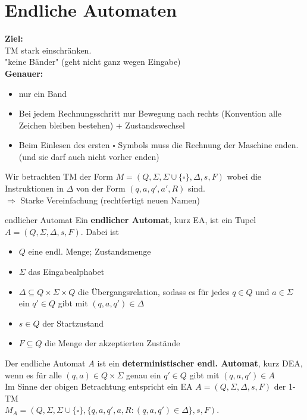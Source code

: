 
\section{Endliche Automaten}
 
\textbf{Ziel:}\\
TM stark einschränken. \\
"keine Bänder" (geht nicht ganz wegen Eingabe)\\

\textbf{Genauer:}
\begin{itemize}
    \item nur ein Band
    \item Bei jedem Rechnungsschritt nur Bewegung nach rechts (Konvention alle Zeichen bleiben bestehen) + Zustandswechsel
    \item Beim Einlesen des ersten $\square$ Symbols muss die Rechnung der Maschine enden. (und sie darf auch nicht vorher enden)
\end{itemize} 

Wir betrachten TM der Form $M = (Q, \Sigma, \Sigma \cup \{\square\}, \Delta, s, F)$ wobei
die Instruktionen in $\Delta$ von der Form $(q,a,q',a',R)$ sind. \\
$\Rightarrow$ Starke Vereinfachung (rechtfertigt neuen Namen)

\begin{defn}{endlicher Automat}
    Ein \textbf{endlicher Automat}, kurz EA, ist ein Tupel $A = (Q, \Sigma, \Delta, s,F)$.
    Dabei ist
    \begin{itemize}
        \item $Q$ eine endl. Menge; Zustandsmenge
        \item $\Sigma$ das Eingabealphabet
        \item $\Delta \subseteq Q \times \Sigma \times Q$ die Übergangsrelation, 
              sodass es für jedes $q \in Q$ und $a \in \Sigma$ ein $q' \in Q$ gibt mit 
              $(q,a,q') \in \Delta$
        \item $s \in Q$ der Startzustand
        \item $F \subseteq Q$ die Menge der akzeptierten Zustände
    \end{itemize}

    Der endliche Automat $A$ ist ein \textbf{deterministischer endl. Automat}, kurz DEA,
    wenn es für alle $(q,a) \in Q \times \Sigma$ genau ein $q' \in Q$ gibt mit $(q,a,q') \in A$ \\

    Im Sinne der obigen Betrachtung entspricht ein EA $A=(Q, \Sigma, \Delta, s, F)$ der 1-TM \\
    $M_A = (Q, \Sigma, \Sigma \cup \{\square\},\{q,a,q',a,R:(q,a,q') \in \Delta\},s,F)$.
\end{defn}

